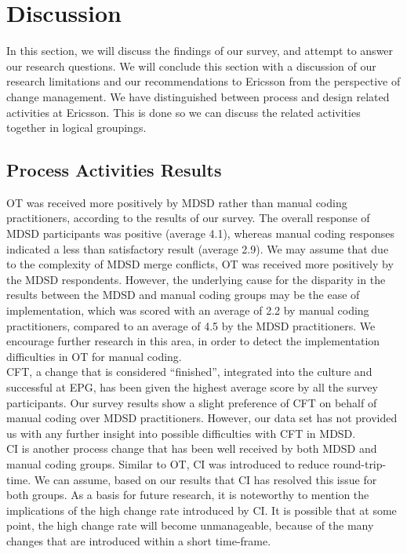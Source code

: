\documentclass[final_report_innit.tex]{subfiles}
\begin{document}
\section{Discussion}

In this section, we will discuss the findings of our survey, and attempt to answer our research questions. We will conclude this section with a discussion of our research limitations and our recommendations to Ericsson from the perspective of change management. We have distinguished between process and design related activities at Ericsson. This is done so we can discuss the related activities together in logical groupings.

\subsection{Process Activities Results}

OT was received more positively by MDSD rather than manual coding practitioners, according to the results of our survey. The overall response of MDSD participants was positive (average 4.1), whereas manual coding responses indicated a less than satisfactory result (average 2.9). We may assume that due to the complexity of MDSD merge conflicts, OT was received more positively by the MDSD respondents. However, the underlying cause for the disparity in the results between the MDSD and manual coding groups may be the ease of implementation, which was scored with an average of 2.2 by manual coding practitioners, compared to an average of 4.5 by the MDSD practitioners. We encourage further research in this area, in order to detect the implementation difficulties in OT for manual coding.
\\

CFT, a change that is considered ``finished'', integrated into the culture and successful at EPG, has been given the highest average score by all the survey participants. Our survey results show a slight preference of CFT on behalf of manual coding over MDSD practitioners. However, our data set has not provided us with any further insight into possible difficulties with CFT in MDSD. 
\\

CI is another process change that has been well received by both MDSD and manual coding groups. Similar to OT, CI was introduced to reduce round-trip-time. We can assume, based on our results that CI has resolved this issue for both groups. As a basis for future research, it is noteworthy to mention the implications of the high change rate introduced by CI. It is possible that at some point, the high change rate will become unmanageable, because of the many changes that are introduced within a short time-frame.
\\
\end{document}
